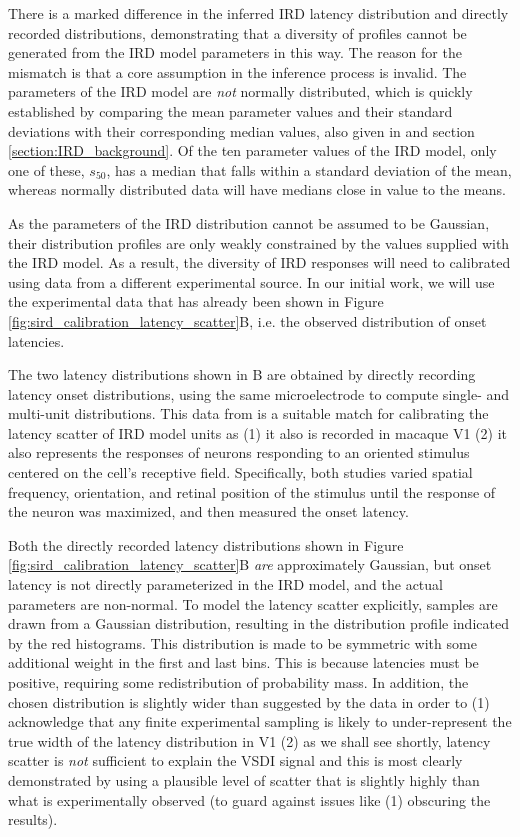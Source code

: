 \documentclass[phd,ianc,twoside]{infthesis}
\begin{document}
There is a marked difference in the inferred IRD latency distribution
and directly recorded distributions, demonstrating that a diversity
of profiles cannot be generated from the IRD model parameters in this
way. The reason for the mismatch is that a core assumption in the
inference process is invalid. The parameters of the IRD model are
\emph{not} normally distributed, which is quickly established by
comparing the mean parameter values and their standard deviations with
their corresponding median values, also given in
\citet{albrecht_jneurophys02} and section
\ref{section:IRD_background}. Of the ten parameter values of the IRD
model, only one of these, $s_{50}$, has a median that falls within a
standard deviation of the mean, whereas normally distributed data will
have medians close in value to the means.

As the parameters of the IRD distribution cannot be assumed to be
Gaussian, their distribution profiles are only weakly constrained by the values
supplied with the IRD model. As a result, the diversity of IRD
responses will need to calibrated using data from a different experimental
source. In our initial work, we will use the experimental data that
has already been shown in Figure
\ref{fig:sird_calibration_latency_scatter}B, i.e. the observed
distribution of onset latencies.

The two latency distributions shown in B are obtained by directly
recording latency onset distributions, using the same microelectrode
to compute single- and multi-unit distributions. This data from
\citet{nowak_visneuro95} is a suitable match for calibrating the latency
scatter of IRD model units as (1) it also is recorded in macaque V1 (2)
it also represents the responses of neurons responding to an oriented
stimulus centered on the cell's receptive field. Specifically, both
studies varied spatial frequency, orientation, and retinal position of
the stimulus until the response of the neuron was maximized, and then
measured the onset latency.

Both the directly recorded latency distributions shown in Figure
\ref{fig:sird_calibration_latency_scatter}B \emph{are} approximately
Gaussian, but onset latency is not directly parameterized in the IRD
model, and the actual parameters are non-normal. To model the latency
scatter explicitly, samples are drawn from a
Gaussian distribution, resulting in the distribution profile indicated
by the red histograms. This distribution is made to be symmetric with
some additional weight in the first and last bins. This is because
latencies must be positive, requiring some redistribution of probability
mass. In addition, the chosen distribution is slightly wider than
suggested by the data in order to (1) acknowledge that any finite experimental
sampling is likely to under-represent the true width of the latency
distribution in V1 (2) as we shall see shortly, latency scatter is
\emph{not} sufficient to explain the VSDI signal and this is most
clearly demonstrated by using a plausible level of scatter that is
slightly highly than what is experimentally observed (to guard against
issues like (1) obscuring the results).
\end{document}
